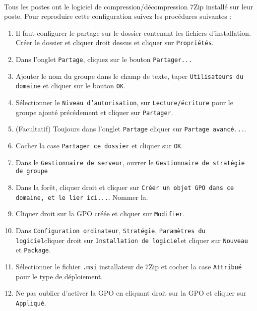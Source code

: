 			\paragraph{}
				Tous les postes ont le logiciel de compression/décompression 7Zip installé sur leur poste. Pour reproduire cette configuration suivez les procédures suivantes : 
				\begin{enumerate}
					\item Il faut configurer le partage sur le dossier contenant les fichiers d'installation. Créer le dossier et cliquer droit dessus et cliquer sur \texttt{Propriétés}.
					\item Dans l'onglet \texttt{Partage}, cliquez sur le bouton \texttt{Partager...}
					\item Ajouter le nom du groupe dans le champ de texte, taper \texttt{Utilisateurs du domaine} et cliquer sur le bouton \texttt{OK}.
					\item Sélectionner le \texttt{Niveau d'autorisation}, sur \texttt{Lecture/écriture} pour le groupe ajouté précédement et cliquer sur \texttt{Partager}.
					\item (Facultatif) Toujours dans l'onglet \texttt{Partage} cliquer sur \texttt{Partage avancé...}.
					\item Cocher la case \texttt{Partager ce dossier} et cliquer sur \texttt{OK}.
					\item Dans le \texttt{Gestionnaire de serveur}, ouvrer le \texttt{Gestionnaire de stratégie de groupe}
					\item Dans la forêt, cliquer droit et cliquer sur \texttt{Créer un objet GPO dans ce domaine, et le lier ici...}. Nommer la. 
					\item Cliquer droit sur la GPO créée et cliquer sur \texttt{Modifier}.
					\item Dans \texttt{Configuration ordinateur}, \texttt{Stratégie}, \texttt{Paramètres du logiciel}cliquer droit sur \texttt{Installation de logiciel}et cliquer sur \texttt{Nouveau}  et \texttt{Package}.
					\item Sélectionner le fichier \texttt{.msi} installateur de 7Zip et cocher la case \texttt{Attribué} pour le type de déploiement.
					\item Ne pas oublier d'activer la GPO en cliquant droit sur la GPO et cliquer sur \texttt{Appliqué}.
				\end{enumerate}